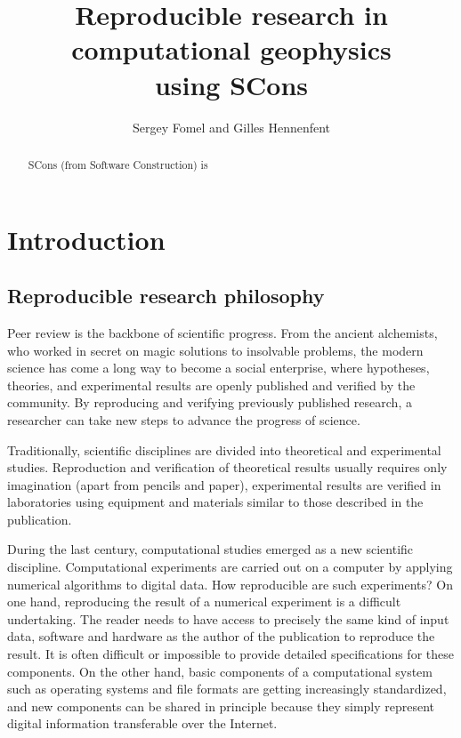 \title{Reproducible research in computational geophysics \\ using SCons}


\author{Sergey Fomel and Gilles Hennenfent}

\maketitle

\begin{abstract}
SCons (from Software Construction) is
\end{abstract}

\section{Introduction}

\subsection{Reproducible research philosophy}

Peer review is the backbone of scientific progress. From the ancient
alchemists, who worked in secret on magic solutions to insolvable
problems, the modern science has come a long way to become a social
enterprise, where hypotheses, theories, and experimental results are
openly published and verified by the community. By reproducing and
verifying previously published research, a researcher can take new
steps to advance the progress of science.

Traditionally, scientific disciplines are divided into theoretical and
experimental studies. Reproduction and verification of theoretical
results usually requires only imagination (apart from pencils and
paper), experimental results are verified in laboratories using
equipment and materials similar to those described in the publication.

During the last century, computational studies emerged as a new
scientific discipline. Computational experiments are carried out on a
computer by applying numerical algorithms to digital data. How
reproducible are such experiments? On one hand, reproducing the result
of a numerical experiment is a difficult undertaking. The reader needs
to have access to precisely the same kind of input data, software and
hardware as the author of the publication to reproduce the result. It
is often difficult or impossible to provide detailed specifications
for these components. On the other hand, basic components of a
computational system such as operating systems and file formats are
getting increasingly standardized, and new components can be shared in
principle because they simply represent digital information
transferable over the Internet.

